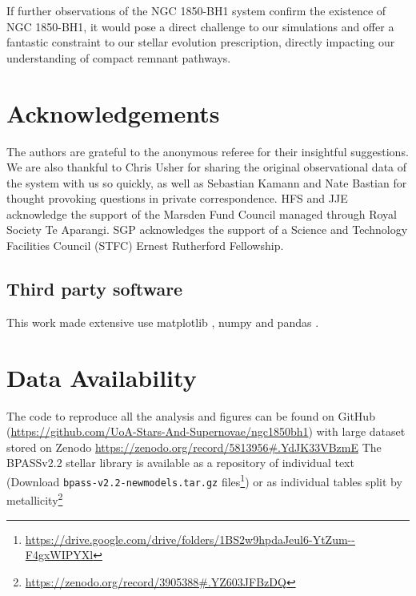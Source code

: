\documentclass[fleqn,usenatbib]{mnras}
\begin{document}
If further observations of the NGC 1850-BH1 system confirm the existence of NGC 1850-BH1, it would pose a direct challenge to  our simulations and offer a fantastic constraint to our stellar evolution prescription, directly impacting our understanding of compact remnant pathways. 



\section*{Acknowledgements}
The authors are grateful to the anonymous referee for their insightful suggestions.
We are also thankful to Chris Usher for sharing the original observational data of the system with us so quickly, as well as Sebastian Kamann and Nate Bastian for thought provoking questions in private correspondence. 
HFS and JJE acknowledge the support of the Marsden Fund Council managed through Royal Society Te Aparangi. 
SGP acknowledges the support of a Science and Technology Facilities Council (STFC) Ernest Rutherford Fellowship.
\subsection*{Third party software}
This work made extensive use matplotlib \cite{matplotlib}, numpy \citep{matplotlib, numpy} and pandas \cite{pandas1, pandas2}.

\section*{Data Availability}
The code to reproduce all the analysis and figures can be found on GitHub ({\url{https://github.com/UoA-Stars-And-Supernovae/ngc1850bh1}}) with large dataset stored on Zenodo {\url{https://zenodo.org/record/5813956\#.YdJK33VBzmE}}
The BPASSv2.2 stellar library is available as a repository of individual text (Download {\tt bpass-v2.2-newmodels.tar.gz} files\footnote{\url{https://drive.google.com/drive/folders/1BS2w9hpdaJeul6-YtZum--F4gxWIPYXl}})  or as individual tables split by metallicity\footnote{\url{https://zenodo.org/record/3905388\#.YZ603JFBzDQ}} 







\end{document}
